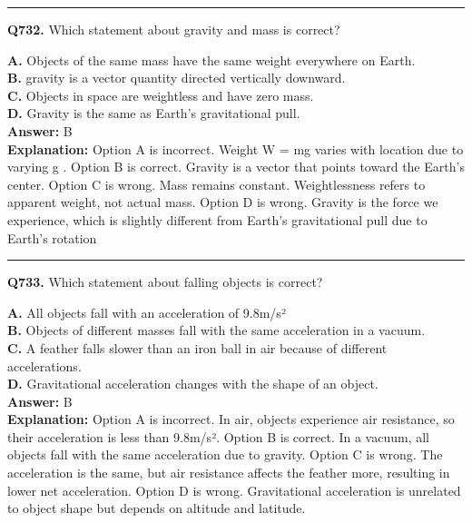 \documentclass[12pt]{article}
\begin{document}
\hrule
\vspace{1em}


\noindent
\textbf{Q732.} Which statement about gravity and mass is correct?



\textbf{A.} Objects of the same mass have the same weight everywhere on Earth. \\
\textbf{B.} gravity is a vector quantity directed vertically downward. \\
\textbf{C.} Objects in space are weightless and have zero mass. \\
\textbf{D.} Gravity is the same as Earth's gravitational pull. \\

\textbf{Answer:} B \\
\textbf{Explanation:} Option A is incorrect. Weight
W
=
mg
varies with location due to varying
g
.
Option B is correct. Gravity is a vector that points toward the Earth's center.
Option C is wrong. Mass remains constant. Weightlessness refers to apparent weight, not actual mass.
Option D is wrong. Gravity is the force we experience, which is slightly different from Earth's gravitational pull due to Earth's rotation

\hrule
\vspace{1em}


\noindent
\textbf{Q733.} Which statement about falling objects is correct?



\textbf{A.} All objects fall with an acceleration of 9.8m/s² \\
\textbf{B.} Objects of different masses fall with the same acceleration in a vacuum. \\
\textbf{C.} A feather falls slower than an iron ball in air because of different accelerations. \\
\textbf{D.} Gravitational acceleration changes with the shape of an object. \\

\textbf{Answer:} B \\
\textbf{Explanation:} Option A is incorrect. In air, objects experience air resistance, so their acceleration is less than 9.8m/s².
Option B is correct. In a vacuum, all objects fall with the same acceleration due to gravity.
Option C is wrong. The acceleration is the same, but air resistance affects the feather more, resulting in lower net acceleration.
Option D is wrong. Gravitational acceleration is unrelated to object shape but depends on altitude and latitude.
\end{document}
